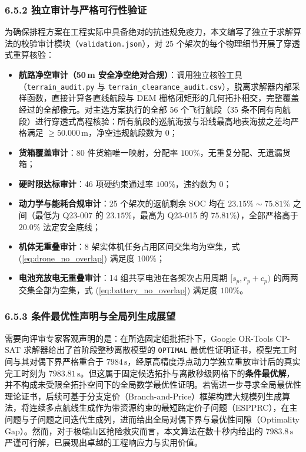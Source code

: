 \documentclass[withoutpreface,bwprint]{format}
\begin{document}
\subsubsection{6.5.2 独立审计与严格可行性验证}
为确保排程方案在工程实际中具备绝对的抗违规免疫力，本文编写了独立于求解算法的校验审计模块（\texttt{validation.json}），对 25 个架次的每个物理细节开展了穿透式重算核验：
\begin{itemize}[leftmargin=*]
    \item \textbf{航路净空审计（50\,m 安全净空绝对合规）}：调用独立核验工具（\texttt{terrain\_audit.py} 与 \texttt{terrain\_clearance\_audit.csv}），脱离求解器内部采样函数，直接计算各直线航段与 DEM 栅格闭矩形的几何拓扑相交，完整覆盖经过的全部像元。对主选方案执行的全部 56 个飞行航段（35 条不同有向航段）进行穿透式高程核验：所有航段的巡航海拔与沿线最高地表海拔之差均严格满足 $\ge 50.000\,\text{m}$，净空违规航段数为 0；
    \item \textbf{货箱覆盖审计}：80 件货箱唯一映射，分配率 $100\%$，无重复分配、无遗漏货箱；
    \item \textbf{硬时限达标审计}：46 项硬约束通过率 $100\%$，违约数为 0；
    \item \textbf{动力学与能耗合规审计}：25 个架次的返航剩余 SOC 均在 $23.15\% \sim 75.81\%$ 之间（最低为 Q23-007 的 $23.15\%$，最高为 Q23-015 的 $75.81\%$），全部严格高于 $20.0\%$ 法定安全底线；
    \item \textbf{机体无重叠审计}：8 架实体机任务占用区间交集均为空集，式 (\ref{eq:drone_no_overlap}) 满足度 $100\%$；
    \item \textbf{电池充放电无重叠审计}：14 组共享电池在各架次占用周期 $[s_p, r_p + c_p)$ 的两两交集全部为空集，式 (\ref{eq:battery_no_overlap}) 满足度 $100\%$。
\end{itemize}

\subsubsection{6.5.3 条件最优性声明与全局列生成展望}
需要向评审专家客观声明的是：在所选固定组批拓扑下，Google OR-Tools CP-SAT 求解器给出了首阶段整秒离散模型的 \texttt{OPTIMAL} 最优性证明证书，模型完工时间与其对偶下界严格重合于 $7984\,\text{s}$，经原高精度浮点动力学独立重放审计后的真实完工时刻为 $7983.81\,\text{s}$。但这属于固定候选拓扑与离散秒级网格下的\textbf{条件最优解}，并不构成未受限全拓扑空间下的全局数学最优性证明。若需进一步寻求全局最优性理论证书，后续可基于分支定价（Branch-and-Price）框架构建大规模列生成算法，将连续多点航线生成作为带资源约束的最短路定价子问题（ESPPRC），在主问题与子问题之间迭代生成列，进而给出全局对偶下界与最优性间隙（Optimality Gap）。然而，对于极端山区抢险救灾而言，本文算法在数十秒内给出的 $7983.8\,\text{s}$ 严谨可行解，已展现出卓越的工程响应力与实用价值。
\end{document}
